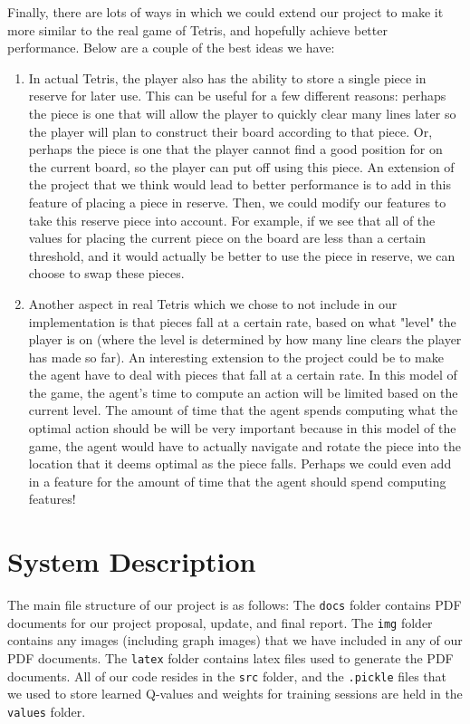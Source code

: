 \documentclass[10pt]{article}
\begin{document}
Finally, there are lots of ways in which we could extend our project to make it more similar to the real game of Tetris, and hopefully achieve better performance. Below are a couple of the best ideas we have:
\begin{enumerate}
    \item In actual Tetris, the player also has the ability to store a single piece in reserve for later use. This can be useful for a few different reasons: perhaps the piece is one that will allow the player to quickly clear many lines later so the player will plan to construct their board according to that piece. Or, perhaps the piece is one that the player cannot find a good position for on the current board, so the player can put off using this piece. An extension of the project that we think would lead to better performance is to add in this feature of placing a piece in reserve. Then, we could modify our features to take this reserve piece into account. For example, if we see that all of the values for placing the current piece on the board are less than a certain threshold, and it would actually be better to use the piece in reserve, we can choose to swap these pieces.
    \item Another aspect in real Tetris which we chose to not include in our implementation is that pieces fall at a certain rate, based on what "level" the player is on (where the level is determined by how many line clears the player has made so far). An interesting extension to the project could be to make the agent have to deal with pieces that fall at a certain rate. In this model of the game, the agent's time to compute an action will be limited based on the current level. The amount of time that the agent spends computing what the optimal action should be will be very important because in this model of the game, the agent would have to actually navigate and rotate the piece into the location that it deems optimal as the piece falls. Perhaps we could even add in a feature for the amount of time that the agent should spend computing features!
\end{enumerate}

\appendix

\section{System Description}
The main file structure of our project is as follows:
The \texttt{docs} folder contains PDF documents for our project proposal, update, and final report. The \texttt{img} folder contains any images (including graph images) that we have included in any of our PDF documents. The \texttt{latex} folder contains latex files used to generate the PDF documents. All of our code resides in the \texttt{src} folder, and the \texttt{.pickle} files that we used to store learned Q-values and weights for training sessions are held in the \texttt{values} folder.
\end{document}
